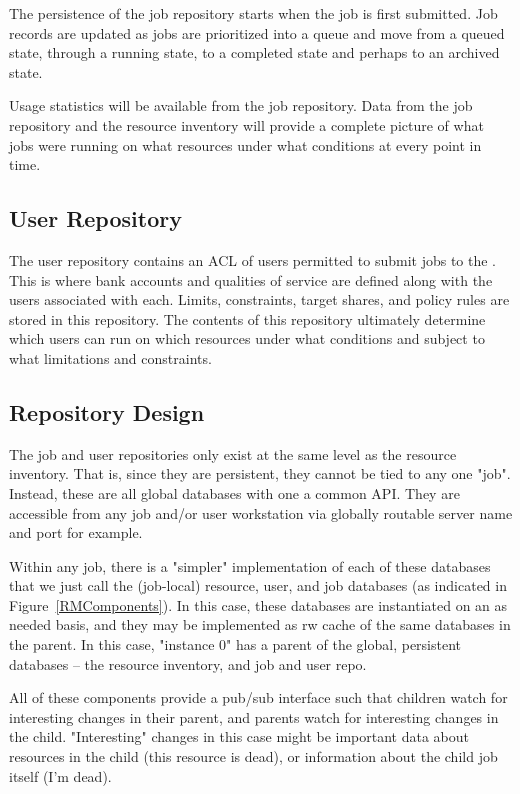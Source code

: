 The persistence of the job repository starts when the job is first
submitted.  Job records are updated as jobs are prioritized into a
queue and move from a queued state, through a running state, to a
completed state and perhaps to an archived state.

Usage statistics will be available from the job repository.  Data from
the job repository and the resource inventory will provide a complete
picture of what jobs were running on what resources under what
conditions at every point in time.

\subsection{User Repository}

The user repository contains an ACL of users permitted to submit jobs
to the \ngrm.  This is where bank accounts and qualities of service
are defined along with the users associated with each.  Limits,
constraints, target shares, and policy rules are stored in this
repository.  The contents of this repository ultimately determine
which users can run on which resources under what conditions and
subject to what limitations and constraints.

\subsection{Repository Design}

The job and user repositories only exist at the same level as the
resource inventory. That is, since they are persistent, they cannot be
tied to any one "job". Instead, these are all global databases with
one a common API.  They are accessible from any job and/or user
workstation via globally routable server name and port for example.

Within any job, there is a "simpler" implementation of each of these
databases that we just call the (job-local) resource, user, and job
databases (as indicated in Figure~\ref{RMComponents}).  In this case,
these databases are instantiated on an as needed basis, and they may
be implemented as rw cache of the same databases in the parent. In
this case, "instance 0" has a parent of the global, persistent
databases -- the resource inventory, and job and user repo.

All of these components provide a pub/sub interface such that children
watch for interesting changes in their parent, and parents watch for
interesting changes in the child. "Interesting" changes in this case
might be important data about resources in the child (this resource is
dead), or information about the child job itself (I'm dead).

